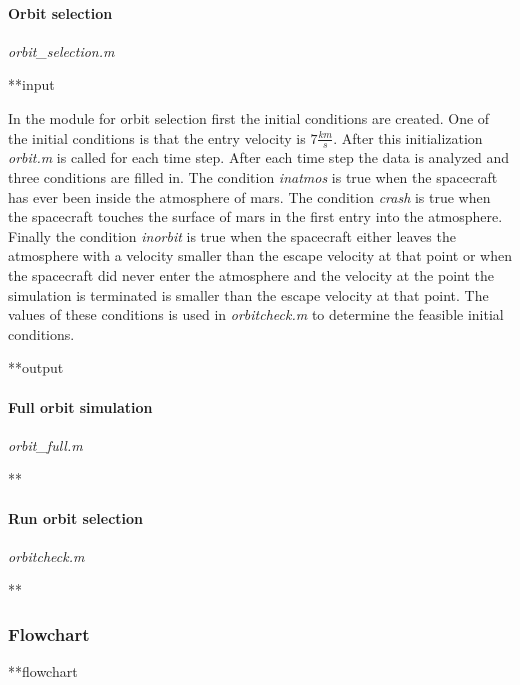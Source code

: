 \paragraph{Orbit selection} \textit{orbit\_selection.m}

**input

In the module for orbit selection first the initial conditions are created. One of the initial conditions is that the entry velocity is $7 \frac{km}{s}$. After this initialization \textit{orbit.m} is called for each time step. After each time step the data is analyzed and three conditions are filled in. The condition \textit{inatmos} is true when the spacecraft has ever been inside the atmosphere of mars. The condition \textit{crash} is true when the spacecraft touches the surface of mars in the first entry into the atmosphere. Finally the condition \textit{inorbit} is true when the spacecraft either leaves the atmosphere with a velocity smaller than the escape velocity at that point or when the spacecraft did never enter the atmosphere and the velocity at the point the simulation is terminated is smaller than the escape velocity at that point. The values of these conditions is used in \textit{orbitcheck.m} to determine the feasible initial conditions.

**output

\paragraph{Full orbit simulation} \textit{orbit\_full.m}

**

\paragraph{Run orbit selection} \textit{orbitcheck.m}

**

\subsubsection{Flowchart} \label{subsec:flow}
**flowchart

